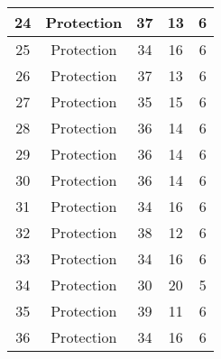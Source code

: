 \documentclass[results.tex]{subfiles}
\begin{document}
\begin{center}
\begin{tabular}{| c || c | c | c | c |}
            \hline
            24                      & Protection                   & 37                     & 13                      & 6                    \\
            \hline
            25                      & Protection                   & 34                     & 16                      & 6                    \\
            \hline
            26                      & Protection                   & 37                     & 13                      & 6                    \\
            \hline
            27                      & Protection                   & 35                     & 15                      & 6                    \\
            \hline
            28                      & Protection                   & 36                     & 14                      & 6                    \\
            \hline
            29                      & Protection                   & 36                     & 14                      & 6                    \\
            \hline
            30                      & Protection                   & 36                     & 14                      & 6                    \\
            \hline
            31                      & Protection                   & 34                     & 16                      & 6                    \\
            \hline
            32                      & Protection                   & 38                     & 12                      & 6                    \\
            \hline
            33                      & Protection                   & 34                     & 16                      & 6                    \\
            \hline
            34                      & Protection                   & 30                     & 20                      & 5                    \\
            \hline
            35                      & Protection                   & 39                     & 11                      & 6                    \\
            \hline
            36                      & Protection                   & 34                     & 16                      & 6                    \\

\end{tabular}
\end{center}
\end{document}
